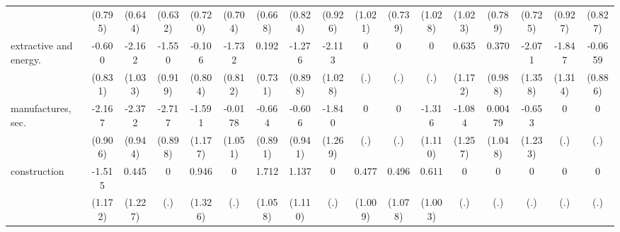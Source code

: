 {\begin{tabular}{l*{16}{c}}
                    &     (0.795)         &     (0.644)         &     (0.632)         &     (0.720)         &     (0.704)         &     (0.668)         &     (0.824)         &     (0.926)         &     (1.021)         &     (0.739)         &     (1.028)         &     (1.023)         &     (0.789)         &     (0.725)         &     (0.927)         &     (0.827)         \\
[1em]
extractive and energy.&      -0.600         &      -2.162\sym{*}  &      -1.550         &      -0.106         &      -1.732\sym{*}  &       0.192         &      -1.276         &      -2.113\sym{*}  &           0         &           0         &           0         &       0.635         &       0.370         &      -2.071         &      -1.847         &     -0.0659         \\
                    &     (0.831)         &     (1.033)         &     (0.919)         &     (0.804)         &     (0.812)         &     (0.731)         &     (0.898)         &     (1.028)         &         (.)         &         (.)         &         (.)         &     (1.172)         &     (0.988)         &     (1.358)         &     (1.314)         &     (0.886)         \\
[1em]
manufactures, sec.  &      -2.167\sym{*}  &      -2.372\sym{*}  &      -2.717\sym{**} &      -1.591         &     -0.0178         &      -0.664         &      -0.606         &      -1.840         &           0         &           0         &      -1.316         &      -1.084         &     0.00479         &      -0.653         &           0         &           0         \\
                    &     (0.906)         &     (0.944)         &     (0.898)         &     (1.177)         &     (1.051)         &     (0.891)         &     (0.941)         &     (1.269)         &         (.)         &         (.)         &     (1.110)         &     (1.257)         &     (1.048)         &     (1.233)         &         (.)         &         (.)         \\
[1em]
construction        &      -1.515         &       0.445         &           0         &       0.946         &           0         &       1.712         &       1.137         &           0         &       0.477         &       0.496         &       0.611         &           0         &           0         &           0         &           0         &           0         \\
                    &     (1.172)         &     (1.227)         &         (.)         &     (1.326)         &         (.)         &     (1.058)         &     (1.110)         &         (.)         &     (1.009)         &     (1.078)         &     (1.003)         &         (.)         &         (.)         &         (.)         &         (.)         &         (.)         \\

\end{tabular}}
